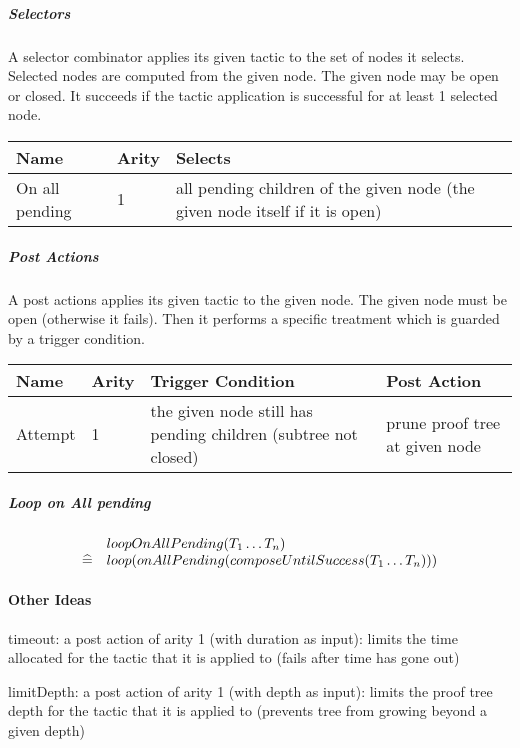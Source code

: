 \subparagraph{Selectors}

A selector combinator applies its given tactic to the set of nodes it selects. Selected nodes are computed from the given node. The given node may be open or closed. It succeeds if the tactic application is successful for at least 1 selected node. 

\begin{center}
    \begin{tabular}{ | l | l | p{} |}
    \hline
	Name & Arity & Selects \\ \hline
	On all pending  & 1 & all pending children of the given node (the given node itself if it is open) \\ \hline
    \end{tabular}
\end{center}

\subparagraph{Post Actions}

A post actions applies its given tactic to the given node. The given node must be open (otherwise it fails). Then it performs a specific treatment which is guarded by a trigger condition. 

\begin{center}
    \begin{tabular}{ | l | l | p{} | p{} |}
    \hline
	Name & Arity & Trigger Condition & Post Action \\ \hline
	Attempt & 1 & the given node still has pending children (subtree not closed) & prune proof tree at given node  \\ \hline
    \end{tabular}
\end{center}

\subparagraph{Loop on All pending}
\[
\begin{array}{rl}
        & loopOnAllPending(T_1 \ldots T_n) \\
  \mathrel{\widehat=} & loop(onAllPending(composeUntilSuccess(T_1 \ldots T_n)))
\end{array}
\]

\paragraph{Other Ideas}

    timeout: a post action of arity 1 (with duration as input): limits the time allocated for the tactic that it is applied to (fails after time has gone out)

    limitDepth: a post action of arity 1 (with depth as input): limits the proof tree depth for the tactic that it is applied to (prevents tree from growing beyond a given depth)

